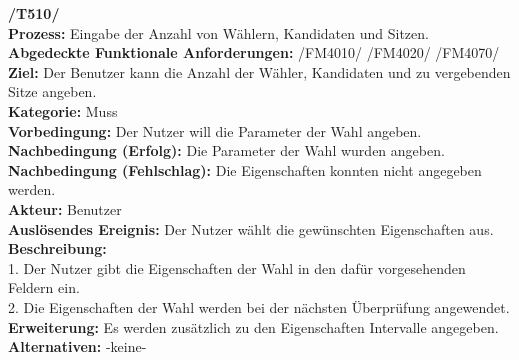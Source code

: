 \documentclass[a4paper]{scrreprt}
\begin{document}
\textbf{/T510/}\\
\textbf{Prozess: }Eingabe der Anzahl von Wählern, Kandidaten und Sitzen.\\
\textbf{Abgedeckte Funktionale Anforderungen:} /FM4010/ /FM4020/ /FM4070/ \\
\textbf{Ziel:} Der Benutzer kann die Anzahl der Wähler, Kandidaten und zu
vergebenden Sitze angeben. \\
\textbf{Kategorie:} Muss\\
\textbf{Vorbedingung:} Der Nutzer will die Parameter der Wahl angeben.\\
\textbf{Nachbedingung (Erfolg):} Die Parameter der Wahl wurden angeben.\\
\textbf{Nachbedingung (Fehlschlag):} Die Eigenschaften konnten nicht angegeben
werden.\\
\textbf{Akteur:} Benutzer\\
\textbf{Auslösendes Ereignis:} Der Nutzer wählt die gewünschten Eigenschaften
aus.\\
\textbf{Beschreibung:} \\
1. Der Nutzer gibt die Eigenschaften der Wahl in den dafür vorgesehenden
Feldern ein.\\
2. Die Eigenschaften der Wahl werden bei der nächsten Überprüfung angewendet.\\
\textbf {Erweiterung:}  Es werden zusätzlich zu den Eigenschaften Intervalle
angegeben.\\
\textbf {Alternativen:} -keine- \\ \\
\end{document}
